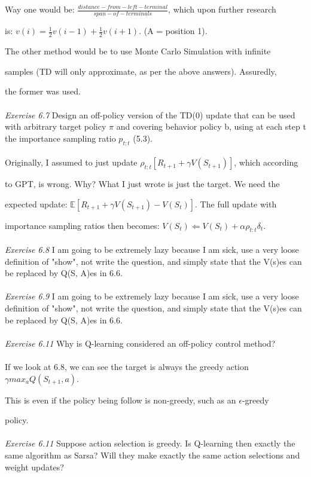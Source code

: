 \documentclass{article}
\begin{document}
Way one would be: $\frac{distance-from-left-terminal}{span-of-terminals}$, which upon further research 

is: $v(i) = \frac{1}{2}v(i-1) + \frac{1}{2}v(i+1)$. (A = position 1).

The other method would be to use Monte Carlo Simulation with infinite 

samples (TD will only approximate, as per the above answers). Assuredly, 

the former was used.
\\\\
\textit{Exercise 6.7} Design an off-policy version of the TD(0) update that can be used with arbitrary target policy $\pi$ and covering behavior policy b, using at each step t the importance
sampling ratio $p_{t:t}$ (5.3).
\\
\\

Originally, I assumed to just update $\rho_{t:t}[R_{t+1} + \gamma V(S_{t+1})]$, which according 

to GPT, is wrong. Why? What I just wrote is just the target. We need the 

expected update: $\mathbb{E}[R_{t+1} + \gamma V(S_{t+1}) - V(S_t)]$. The full update with 

importance sampling ratios then becomes: $V(S_{t}) \Leftarrow V(S_{t}) + \alpha\rho_{t:t}\delta_{t}$.
\\\\
\textit{Exercise 6.8} I am going to be extremely lazy because I am sick, use a very loose definition of "show", not write the question, and simply state that the V(s)es can be replaced by Q(S, A)es in 6.6.
\\
\\
\textit{Exercise 6.9} I am going to be extremely lazy because I am sick, use a very loose definition of "show", not write the question, and simply state that the V(s)es can be replaced by Q(S, A)es in 6.6.
\\\\
\textit{Exercise 6.11} Why is Q-learning considered an off-policy control method? 
\\
\\

If we look at 6.8, we can see the target is always the greedy action $\gamma max_{a}Q(S_{t+1}, a)$. 

This is even if the policy being follow is non-greedy, such as an $\epsilon$-greedy 

policy.
\\\\
\textit{Exercise 6.11} Suppose action selection is greedy. Is Q-learning then exactly the same
algorithm as Sarsa? Will they make exactly the same action selections and weight
updates?
\\
\\
\end{document}

